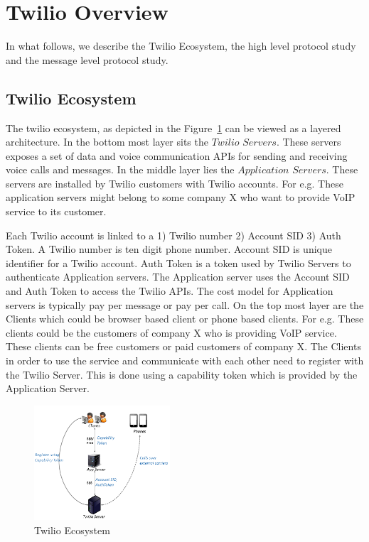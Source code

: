\section{Twilio Overview}
\label{sec-twilioecoandprotocolstudy}
In what follows, we describe the Twilio Ecosystem, the high level protocol study and the message level protocol study.
\subsection{Twilio Ecosystem}
The twilio ecosystem, as depicted in the Figure~\ref{fig:ecosystem} can be viewed as a layered architecture. In the bottom most layer sits the $Twilio$  $Servers$. These servers exposes a set of data and voice communication APIs for sending and receiving voice calls and messages. In the middle layer lies the $Application$ $Servers$. These servers are installed by Twilio customers with Twilio accounts. For e.g. These application servers might belong to some company X who want to provide VoIP service to its customer.  

Each Twilio account is linked to a 1) Twilio number 2) Account SID 3) Auth Token. A Twilio number is ten digit phone number. Account SID is unique identifier for a Twilio account. Auth Token is a token used by Twilio Servers to authenticate Application servers. The Application server uses the Account SID and Auth Token to access the Twilio APIs. The cost model for Application servers is typically pay per message or pay per call. On the top most layer are the Clients which could be browser based client or phone based clients. For e.g. These clients could be the customers of company X who is providing VoIP service. These clients can be free customers or paid customers of company X. The Clients in order to use the service and communicate with each other need to register with the Twilio Server. This is done using a capability token which is provided by the Application Server. 
\begin{figure}
\centering
  \centering
  \includegraphics[width=0.45\textwidth]{figs/Ecosystem.png}
\caption{Twilio Ecosystem}
\label{fig:ecosystem}
\end{figure}     

